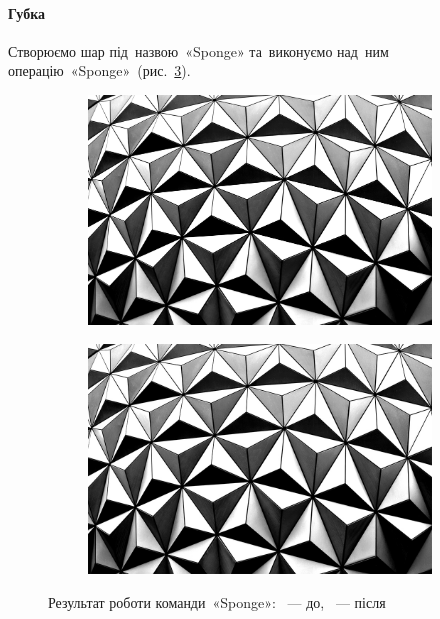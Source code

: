 \documentclass[
	a4paper,
	oneside,
	BCOR = 10mm,
	DIV = 12,
	12pt,
	headings = normal,
]{scrartcl}
\begin{document}
		\paragraph{Губка}
			Створюємо шар під~назвою~\textenglish{«Sponge»} та~виконуємо над~ним операцію~\textenglish{«Sponge»}~(рис.~\ref{fig:06-sponge}).
			\begin{figure}[!htbp]
				\centering
				\begin{subfigure}{0.5\columnwidth}
					\centering
					\includegraphics[height = 6\baselineskip]{./assets/abstract-abstract-photo-art-1070345.jpg}
					\caption{}
					\label{subfig:06-01-sponge}
				\end{subfigure}%
				\begin{subfigure}{0.5\columnwidth}
					\centering
					\includegraphics[height = 6\baselineskip]{./assets/y03s01-multimedia-lab-01-p01-06-sponge.jpg}
					\caption{}
					\label{subfig:06-02-sponge}
				\end{subfigure}%
				\caption{Результат роботи команди~\textenglish{«Sponge»}: ~— до, ~— після}
				\label{fig:06-sponge}
			\end{figure}
\end{document}
